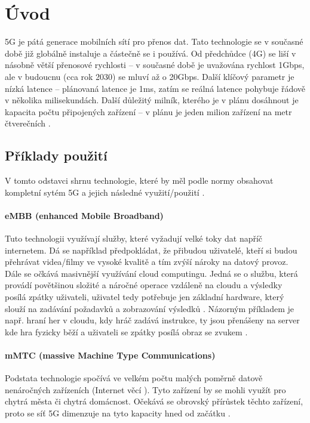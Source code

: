 \newpage
\newcommand{\myuv}[1]{\quotedblbase #1\textquotedblleft}

\chapter{Úvod}
5G je pátá generace mobilních sítí pro přenos dat. Tato technologie se v současné době již globálně instaluje a částečně se i používá. Od předchůdce (4G) se liší v násobně větší přenosové rychlosti -- v současné době je uvažována rychlost 1Gbps, ale v budoucnu (cca rok 2030) se mluví až o 20Gbps. Další klíčový parametr je nízká latence -- plánovaná latence je 1ms, zatím se reálná latence pohybuje řádově v několika milisekundách. Další důležitý milník, kterého je v plánu dosáhnout je kapacita počtu připojených zařízení -- v plánu je jeden milion zařízení na metr čtverečních \cite{QualcommUvod}.  
\section{Příklady použití}\label{uziti}
V tomto odstavci shrnu technologie, které by měl podle normy obsahovat kompletní sytém 5G a jejich následné využití/použití \cite{5Gtechnologi}.
\par
\subsubsection{eMBB (enhanced Mobile Broadband)}
Tuto technologii využívají služby, které vyžadují velké toky dat napříč internetem. Dá se například  předpokládat, že přibudou  uživatelé, kteří si budou přehrávat videa/filmy ve vysoké kvalitě a tím zvýší nároky na datový provoz. Dále se očkává masivnější využívání cloud computingu. Jedná se o službu, která provádí povětšinou složité a náročné operace vzdáleně na cloudu a výsledky posílá zpátky uživateli, uživatel tedy potřebuje jen základní hardware, který slouží na zadávání požadavků a zobrazování výsledků \cite{CloudComputing}. Názorným příkladem  je např. hraní her v cloudu, kdy hráč zadává instrukce, ty jsou přenášeny na server kde hra fyzicky běží a uživateli se zpátky posílá obraz se zvukem \cite{CloudGaming}.   
\par
\subsubsection{mMTC (massive Machine Type Communications)}
Podstata technologie spočívá ve velkém počtu malých poměrně datově nenáročných zařízeních (Internet věcí \cite{IOT}). Tyto zařízení by se mohli využít pro chytrá města či chytrá domácnost. Očekává se obrovský přírůstek těchto zařízení, proto se síť 5G dimenzuje na tyto kapacity hned od začátku \cite{UseCases}.
\par

